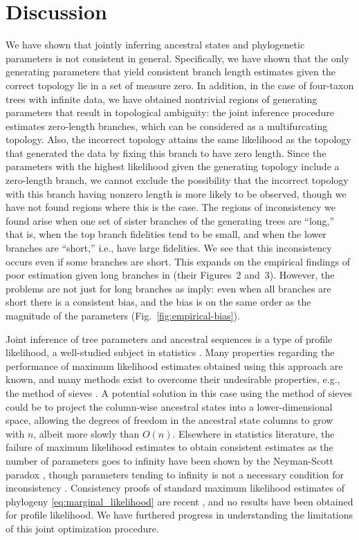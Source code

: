 \documentclass[11pt]{article}
\newcommand{\nCols}{n}
\begin{document}
\section*{Discussion}

We have shown that jointly inferring ancestral states and phylogenetic parameters \citep{Sagulenko2018-xl} is not consistent in general.
Specifically, we have shown that the only generating parameters that yield consistent branch length estimates given the correct topology lie in a set of measure zero.
In addition, in the case of four-taxon trees with infinite data, we have obtained nontrivial regions of generating parameters that result in topological ambiguity: the joint inference procedure estimates zero-length branches, which can be considered as a multifurcating topology.
Also, the incorrect topology attains the same likelihood as the topology that generated the data by fixing this branch to have zero length.
Since the parameters with the highest likelihood given the generating topology include a zero-length branch, we cannot exclude the possibility that the incorrect topology with this branch having nonzero length is more likely to be observed, though we have not found regions where this is the case.
The regions of inconsistency we found arise when one set of sister branches of the generating trees are ``long,'' that is, when the top branch fidelities tend to be small, and when the lower branches are ``short,'' i.e., have large fidelities.
We see that this inconsistency occurs even if some branches are short.
This expands on the empirical findings of poor estimation given long branches in \citet{Sagulenko2018-xl} (their Figures~2 and~3).
However, the problems are not just for long branches as \citet{Sagulenko2018-xl} imply: even when all branches are short there is a consistent bias, and the bias is on the same order as the magnitude of the parameters (Fig.~\ref{fig:empirical-bias}).

Joint inference of tree parameters and ancestral sequences is a type of profile likelihood, a well-studied subject in statistics \citep{Murphy2000-ry}.
Many properties regarding the performance of maximum likelihood estimates obtained using this approach are known, and many methods exist to overcome their undesirable properties, e.g., the method of sieves \citep{Geman1982}.
A potential solution in this case using the method of sieves could be to project the column-wise ancestral states into a lower-dimensional space, allowing the degrees of freedom in the ancestral state columns to grow with $\nCols$, albeit more slowly than $O(\nCols)$.
Elsewhere in statistics literature, the failure of maximum likelihood estimates to obtain consistent estimates as the number of parameters goes to infinity have been shown by the Neyman-Scott paradox \citep{Neyman1948-tt}, though parameters tending to infinity is not a necessary condition for inconsistency \citep{LeCam1990}.
Consistency proofs of standard maximum likelihood estimates of phylogeny \eqref{eq:marginal_likelihood} are recent \citep{Allman2008-wd,Chai2011-ff,RoyChoudhury2015-ta}, and no results have been obtained for profile likelihood.
We have furthered progress in understanding the limitations of this joint optimization procedure.
\end{document}

